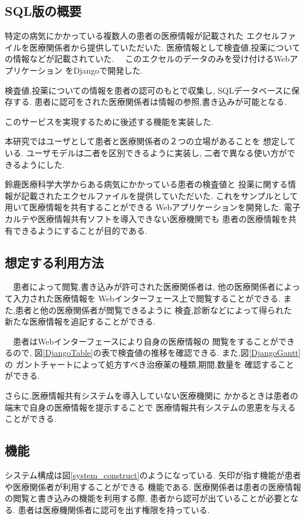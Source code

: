 \subsection{SQL版の概要}

  特定の病気にかかっている複数人の患者の医療情報が記載された
  エクセルファイルを医療関係者から提供していただいた.
  医療情報として検査値,投薬についての情報などが記載されていた.
　このエクセルのデータのみを受け付けるWebアプリケーション
  をDjangoで開発した.

  検査値,投薬についての情報を患者の認可のもとで収集し,
  SQLデータベースに保存する.
  患者に認可をされた医療関係者は情報の参照,書き込みが可能となる.

  このサービスを実現するために後述する機能を実装した.

  本研究ではユーザとして患者と医療関係者の２つの立場があることを
  想定している.
  ユーザモデルは二者を区別できるように実装し,
  二者で異なる使い方ができるようにした.
  \fi

  鈴鹿医療科学大学からある病気にかかっている患者の検査値と
  投薬に関する情報が記載されたエクセルファイルを提供していただいた.
  これをサンプルとして用いて医療情報を共有することができる
  Webアプリケーションを開発した.
  電子カルテや医療情報共有ソフトを導入できない医療機関でも
  患者の医療情報を共有できるようにすることが目的である.


\subsection{想定する利用方法}
  　患者によって閲覧,書き込みが許可された医療関係者は,
  他の医療関係者によって入力された医療情報を
  Webインターフェース上で閲覧することができる.
  また,患者と他の医療関係者が閲覧できるように
  検査,診断などによって得られた
  新たな医療情報を追記することができる.

  　患者はWebインターフェースにより自身の医療情報の
  閲覧をすることができるので,
  図\ref{DjangoTable}の表で検査値の推移を確認できる.
  また,図\ref{DjangoGantt}の
  ガントチャートによって処方すべき治療薬の種類,期間,数量を
  確認することができる.

  さらに,医療情報共有システムを導入していない医療機関に
  かかるときは患者の端末で自身の医療情報を提示することで
  医療情報共有システムの恩恵を与えることができる.


\subsection{機能}
  システム構成は図\ref{system_construct}のようになっている.
  矢印が指す機能が患者や医療関係者が利用することができる
  機能である.
  医療関係者は患者の医療情報の閲覧と書き込みの機能を利用する際,
  患者から認可が出ていることが必要となる.
  患者は医療機関係者に認可を出す権限を持っている.

